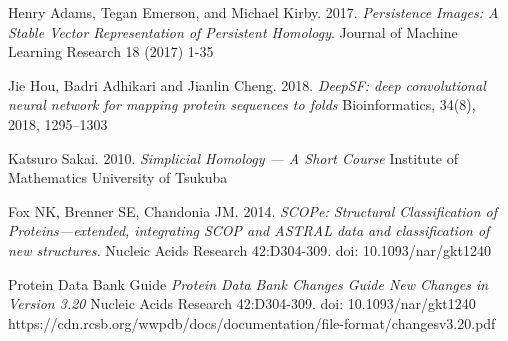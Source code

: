 \documentclass[12pt, a4paper, twocolumn, fullpage]{article}
\theoremstyle{plain}
\theoremstyle{definition}
\theoremstyle{remark}
\begin{document}
\pagebreak
 
\begin{thebibliography}{9}

Henry Adams, Tegan Emerson, and Michael Kirby. 
2017.
\textit{Persistence Images: A Stable Vector Representation of
Persistent Homology}. 
Journal of Machine Learning Research 18 (2017) 1-35

Jie Hou, Badri Adhikari and Jianlin Cheng.
2018.
\textit{DeepSF: deep convolutional neural network for mapping protein sequences to folds}
Bioinformatics, 34(8), 2018, 1295–1303

Katsuro Sakai.
2010.
\textit{Simplicial Homology — A Short Course}
Institute of Mathematics University of Tsukuba

Fox NK, Brenner SE, Chandonia JM.
2014.
\textit{SCOPe: Structural Classification of Proteins—extended, integrating SCOP and ASTRAL data and classification of new structures.}
Nucleic Acids Research 42:D304-309. doi: 10.1093/nar/gkt1240


Protein Data Bank Guide
\textit{Protein Data Bank Changes Guide
	New Changes in Version 3.20}
Nucleic Acids Research 42:D304-309. doi: 10.1093/nar/gkt1240
https://cdn.rcsb.org/wwpdb/docs/documentation/file-format/changesv3.20.pdf

\end{thebibliography}
\end{document}
